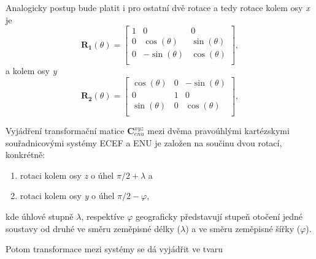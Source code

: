 Analogicky postup bude platit i pro ostatní dvě rotace a tedy rotace kolem osy \textit{x} je
\begin{equation}
\mathbf{R_{1}}\left(\theta\right) = 
\begin{bmatrix}
1 & 0 & 0 \\
0 &  \cos{\left(\theta\right)} & \sin{\left(\theta\right)} \\
0 & -\sin{\left(\theta\right)} & \cos{\left(\theta\right)} \\
\end{bmatrix},
\end{equation}
a kolem osy \textit{y}
\begin{equation}
\mathbf{R_{2}}\left(\theta\right) = 
\begin{bmatrix}
\cos{\left(\theta\right)} & 0 & -\sin{\left(\theta\right)} \\
0 & 1 & 0 \\
\sin{\left(\theta\right)} & 0 & \cos{\left(\theta\right)} \\
\end{bmatrix},
\end{equation}

Vyjádření transformační matice $\mathbf {C}_{enu}^{xyz} $ mezi dvěma pravoúhlými kartézskymi souřadnicovými systémy ECEF a ENU je založen na součinu dvou rotací, konkrétně:
\begin{enumerate}
\item rotaci kolem osy \textit{z} o úhel $\pi/2 + \lambda $ a
\item rotaci kolem osy \textit{y} o úhel $\pi/2 - \varphi $,
\end{enumerate}
kde úhlové stupně $\lambda$, respektíve $\varphi$ geograficky představují stupeň otočení jedné soustavy od druhé ve směru zeměpisné délky ($\lambda$) a ve směru zeměpisné šířky ($\varphi$).

Potom transformace mezi systémy se dá vyjádřit ve tvaru


